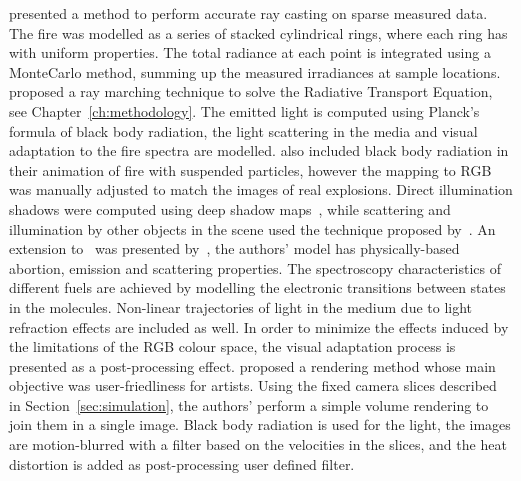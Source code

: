 \cite{Rushmeier:1995} presented a method to perform accurate ray casting on sparse measured data.
The fire was modelled as a series of stacked cylindrical rings, where each ring has with uniform properties.
The total radiance at each point is integrated using a MonteCarlo method, summing up the measured irradiances at sample locations. 
\cite{Nguyen:2002} proposed a ray marching technique to solve the Radiative Transport Equation, see Chapter~\ref{ch:methodology}.
The emitted light is computed using Planck's formula of black body radiation, the light scattering in the media and visual adaptation to the fire spectra are modelled.
\cite{Feldman:2003} also included black body radiation in their animation of fire with suspended particles, however the mapping to RGB was manually adjusted to match the images of real explosions.
Direct illumination shadows were computed using deep shadow maps~\cite{Lokovic:2000}, while scattering and illumination by other objects in the scene used the technique proposed by~\cite{Jensen:2002}.
An extension to~\cite{Nguyen:2002} was presented by~\cite{Pegoraro:2006}, the authors' model has physically-based abortion, emission and scattering properties.
The spectroscopy characteristics of different fuels are achieved by modelling the electronic transitions between states in the molecules.
Non-linear trajectories of light in the medium due to light refraction effects are included as well.
In order to minimize the effects induced by the limitations of the RGB colour space, the visual adaptation process is presented as a post-processing effect.
\cite{Horvath:2009} proposed a rendering method whose main objective was user-friedliness for artists.
Using the fixed camera slices described in Section~\ref{sec:simulation}, the authors' perform a simple volume rendering to join them in a single image.
Black body radiation is used for the light, the images are motion-blurred with a filter based on the velocities in the slices, and the heat distortion is added as post-processing user defined filter. 